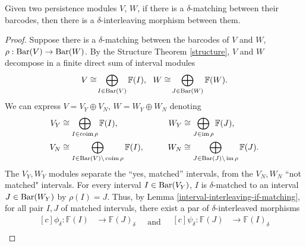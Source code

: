 \begin{proposition} \label{interleaving-if-mathing} %
    Given two persistence modules $ V $, $ W $, if there is a $ \delta$-matching between their barcodes, then there is a $ \delta$-interleaving morphism between them.
\end{proposition}
\begin{proof}
    Suppose there is a $\delta$-matching between the barcodes of $ V $ and $ W $, $\rho: \operatorname{Bar} (V) \to \operatorname{Bar} (W) $. By the Structure Theorem \ref{structure}, $ V $ and $ W $ decompose in a finite direct sum of interval modules
    $$
        V \cong \! \bigoplus_{I \in \operatorname{Bar} (V)} \mathbb F (I), \ \ W \cong \! \bigoplus_{J \in  \operatorname{Bar} (W)} \mathbb F (W) .
    $$
    We can express $ V = V_Y \oplus V_N $, $ W = W_Y \oplus W_N $ denoting
    \begin{equation*}
        \begin{aligned}[c]
        V_Y &\cong \bigoplus_{I \in  \operatorname{coim} \rho} \mathbb F (I),\\
        V_N &\cong \bigoplus_{I \in \operatorname{Bar}(V) \backslash \operatorname{coim} \rho} \mathbb F (I),\\
        \end{aligned}
        \quad \quad \quad
        \begin{aligned}[c]
        W_Y &\cong \bigoplus_{J \in  \operatorname{im} \rho} \mathbb F (J),\\
        W_N &\cong \bigoplus_{J \in \operatorname{Bar}(J) \backslash \operatorname{im} \rho} \mathbb F (J).
        \end{aligned}
    \end{equation*}
    The $ V_Y, W_Y $ modules separate the ``yes, matched'' intervals, from the $ V_N, W_N $ ``not matched" intervals. For every interval $ I \in \operatorname{Bar}(V_Y) $, $ I $ is $\delta$-matched to an interval $ J \in \operatorname{Bar}(W_Y)$ by $\rho(I) = J $. Thus, by Lemma \ref{interval-interleaving-if-matching}, for all pair $ I, J $ of matched intervals, there exist a par of $\delta$-interleaved morphisms
    \begin{equation*}
        \begin{aligned}[c]
        \phi_\delta: \mathbb F(I) &\to \mathbb F(J)_\delta\\
        \end{aligned}
        \quad \text{and} \quad
        \begin{aligned}[c]
        \psi_\delta: \mathbb F(J) &\to \mathbb F(I)_\delta\\
        \end{aligned}

\end{equation*}
\end{proof}
